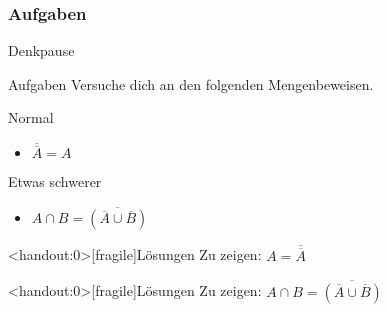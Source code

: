 \subsubsection{Aufgaben}
{
\begin{frame}[fragile]{Denkpause}
    \begin{alertblock}{Aufgaben}
    Versuche dich an den folgenden Mengenbeweisen.
    \end{alertblock}
    
    \begin{block}{Normal}
        \begin{itemize}
            \item $\overline{\overline{A}} = A$
        \end{itemize}
    \end{block}
    \begin{block}{Etwas schwerer}
        \begin{itemize}
            \item $A\cap B=\overline{(\overline{A}\cup\overline{B})}$
        \end{itemize}
    \end{block}
\end{frame}
}

{
\begin{frame}<handout:0>[fragile]{Lösungen}
\onslide Zu zeigen: $A=\overline{\overline{A}}$
\end{frame}
}

{
\begin{frame}<handout:0>[fragile]{Lösungen}
    \onslide Zu zeigen: $A \cap B=\overline{(\overline{A}\cup\overline{B})}$
\end{frame}
}
